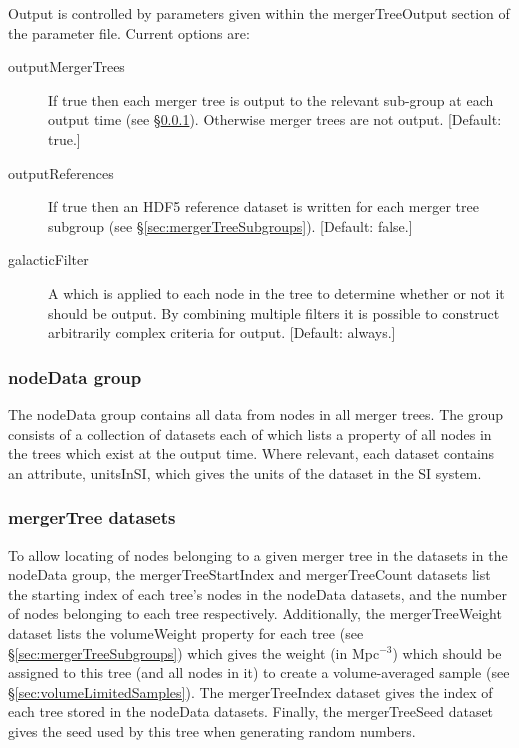 Output is controlled by parameters given within the {\normalfont \ttfamily mergerTreeOutput} section of the parameter file. Current options are:
\begin{description}
\item[{\normalfont \ttfamily outputMergerTrees}] If {\normalfont \ttfamily true} then each merger tree is output to the relevant sub-group at each output time (see \S\ref{sec:nodeDataGroup}). Otherwise merger trees are not output. [Default: {\normalfont \ttfamily true}.]
\item[{\normalfont \ttfamily outputReferences}] If {\normalfont \ttfamily true} then an HDF5 reference dataset is written for each merger tree subgroup (see \S\ref{sec:mergerTreeSubgroups}). [Default: {\normalfont \ttfamily false}.]
\item[{\normalfont \ttfamily galacticFilter}] A  which is applied to each node in the tree to determine whether or not it should be output. By combining multiple filters it is possible to construct arbitrarily complex criteria for output. [Default: {\normalfont \ttfamily always}.]
\end{description}

\subsubsection{nodeData group}\label{sec:nodeDataGroup}

The {\normalfont \ttfamily nodeData} group contains all data from nodes in all merger trees. The group consists of a collection of datasets each of which lists a property of all nodes in the trees which exist at the output time. Where relevant, each dataset contains an attribute, {\normalfont \ttfamily unitsInSI}, which gives the units of the dataset in the SI system.

\subsubsection{mergerTree datasets}\label{sec:mergerTreeDatasets}

To allow locating of nodes belonging to a given merger tree in the datasets in the {\normalfont \ttfamily nodeData} group, the {\normalfont \ttfamily mergerTreeStartIndex} and {\normalfont \ttfamily mergerTreeCount} datasets list the starting index of each tree's nodes in the {\normalfont \ttfamily nodeData} datasets, and the number of nodes belonging to each tree respectively. Additionally, the {\normalfont \ttfamily mergerTreeWeight} dataset lists the {\normalfont \ttfamily volumeWeight} property for each tree (see \S\ref{sec:mergerTreeSubgroups}) which gives the weight (in Mpc$^{-3}$) which should be assigned to this tree (and all nodes in it) to create a volume-averaged sample (see \S\ref{sec:volumeLimitedSamples}). The {\normalfont \ttfamily mergerTreeIndex} dataset gives the index of each tree stored in the {\normalfont \ttfamily nodeData} datasets. Finally, the {\normalfont \ttfamily mergerTreeSeed} dataset gives the seed used by this tree when generating random numbers.

